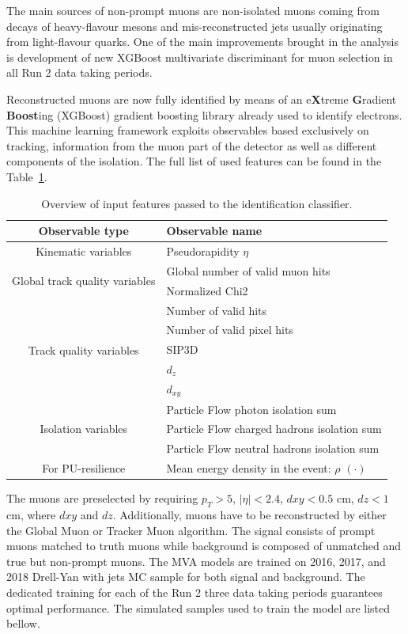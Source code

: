 The main sources of non-prompt muons are non-isolated muons coming from decays of heavy-flavour mesons and mis-reconstructed jets usually originating from
light-flavour quarks. One of the main improvements brought in the analysis is development of new XGBoost multivariate discriminant for muon selection in all
Run 2 data taking periods.

Reconstructed muons are now fully identified by means of an e\textbf{X}treme \textbf{G}radient \textbf{Boost}ing (XGBoost) gradient boosting library already
used to identify electrons. This machine learning framework exploits observables based exclusively on tracking, information from the muon part of the detector
as well as different components of the isolation. The full list of used features can be found in the Table~\ref{tab:muon_MVA_input_variables}.

\begin{table}[H]
\scriptsize
   \centering
   \begin{tabular}{c|l}
\hline
\hline
Observable type & Observable name \\
\hline
\multirow{1}{*}{Kinematic variables}
	& Pseudorapidity $\eta$ \\
\hline
\multirow{2}{*}{Global track quality variables}
	& Global number of valid muon hits\\
	& Normalized Chi2 \\
\hline
\multirow{5}{*}{Track quality variables}
   & Number of valid hits \\
   & Number of valid pixel hits \\
   & SIP3D \\
   & $d_z$ \\
   & $d_{xy}$ \\
\hline
\multirow{3}{*}{Isolation variables}
   & Particle Flow photon isolation sum \\
   & Particle Flow charged hadrons isolation sum \\
   & Particle Flow neutral hadrons isolation sum \\
\hline
\multirow{1}{*}{For PU-resilience}
   & Mean energy density in the event: $\rho$ $(\mathord{\cdot})$ \\
\hline
\hline
     \end{tabular}
\small
    \caption{Overview of input features passed to the identification classifier.}
    \label{tab:muon_MVA_input_variables}
\end{table}

The muons are preselected by requiring $p_T > 5$, $|\eta| < 2.4$, $dxy< 0.5$ cm, $dz < 1$ cm, where $dxy$ and $dz$. Additionally, muons have to be reconstructed
by either the Global Muon or Tracker Muon algorithm. The signal consists of prompt muons matched to truth muons while background is composed of unmatched and true
but non-prompt muons. The MVA models are trained on 2016, 2017, and 2018 Drell-Yan with jets MC sample for both signal and background. The dedicated training for
each of the Run 2 three data taking periods guarantees optimal performance. The simulated samples used to train the model are listed bellow.

